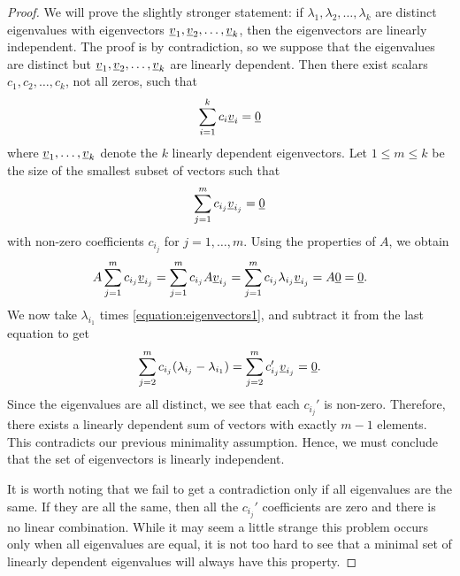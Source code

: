 \begin{proof}
We will prove the slightly stronger statement: if $\lambda_1 , \lambda_2 , \ldots, \lambda_k $ are distinct eigenvalues with eigenvectors $\underline{v}_1 , \underline{v}_2 , \ldots, \underline{v}_k$, then the eigenvectors are linearly independent.
The proof is by contradiction, so we suppose that the eigenvalues are distinct but $\underline{v}_1 , \underline{v}_2 , \ldots, \underline{v}_k$ are linearly dependent.
Then there exist scalars $c_1, c_2, \ldots, c_k$, not all zeros, such that
\begin{equation*}
\sum_{i=1}^k c_i \underline{v}_i = \underline{0}
\end{equation*}
where $\underline{v}_1, \ldots, \underline{v}_k$ denote the $k$ linearly dependent eigenvectors.
Let $1 \leq m \leq k$ be the size of the smallest subset of vectors such that
\begin{equation} \label{equation:eigenvectors1}
\sum_{j=1}^m c_{i_j} \underline{v}_{i_j} = \underline{0}
\end{equation}
with non-zero coefficients $c_{i_j}$ for $j = 1, \ldots, m$.
Using the properties of $A$, we obtain
\begin{equation} \label{equation:eigenvectors2}
A \sum_{j=1}^m c_{i_j} \underline{v}_{i_j}
= \sum_{j=1}^m c_{i_j} A \underline{v}_{i_j}
= \sum_{j=1}^m c_{i_j} \lambda_{i_j} \underline{v}_{i_j}
= A \underline{0} = \underline{0} .
\end{equation}
We now take $\lambda_{i_1}$ times \eqref{equation:eigenvectors1}, and subtract it from the last equation to get
\begin{equation*}
\sum_{j=2}^m c_{i_j} (\lambda_{i_j} - \lambda_{i_1})
= \sum_{j=2}^m c_{i_j}' \underline{v}_{i_j}
 = \underline{0} .
\end{equation*}
Since the eigenvalues are all distinct, we see that each $c_{i_j}'$ is non-zero.
Therefore, there exists a linearly dependent sum of vectors with exactly $m-1$ elements.
This contradicts our previous minimality assumption.
Hence, we must conclude that the set of eigenvectors is linearly independent.

It is worth noting that we fail to get a contradiction only if all eigenvalues are the same.
If they are all the same, then all the $c_{i_j}'$ coefficients are zero and there is no linear combination.
While it may seem a little strange this problem occurs only when all eigenvalues are equal, it is not too hard to see that a minimal set of linearly dependent eigenvalues will always have this property.
\end{proof}

